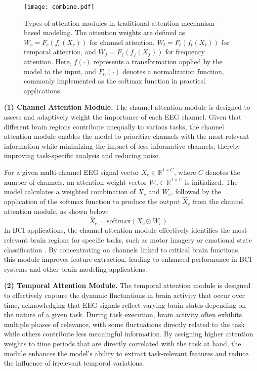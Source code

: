 \documentclass[preprint,12pt]{elsarticle}
\begin{document}
\begin{figure*}[h]
\centering
\texttt{[image: combine.pdf]}
\caption{Types of attention modules in traditional attention mechanism-based modeling. The attention weights are defined as $W_c = F_c(f_c(X_c))$ for channel attention, $W_t = F_t(f_t(X_t))$ for temporal attention, and $W_f = F_f(f_f(X_f))$ for frequency attention. Here, $f(\cdot)$ represents a transformation applied by the model to the input, and $F_n(\cdot)$ denotes a normalization function, commonly implemented as the softmax function in practical applications.}
\label{fig:TypeAtt}
\end{figure*}

\textbf{(1) Channel Attention Module.} The channel attention module is designed to assess and adaptively weight the importance of each EEG channel. Given that different brain regions contribute unequally to various tasks, the channel attention module enables the model to prioritize channels with the most relevant information while minimizing the impact of less informative channels, thereby improving task-specific analysis and reducing noise.

For a given multi-channel EEG signal vector $X_c \in \mathbb{R}^{1 \times C}$, where $C$ denotes the number of channels, an attention weight vector $W_c \in \mathbb{R}^{1 \times C}$ is initialized. The model calculates a weighted combination of $X_c$ and $W_c$, followed by the application of the softmax function to produce the output $\hat{X}_c$ from the channel attention module, as shown below:
\begin{equation}
\hat{X}_c= \text{softmax}(X_c \odot W_c) 
\end{equation}
In BCI applications, the channel attention module effectively identifies the most relevant brain regions for specific tasks, such as motor imagery or emotional state classification \cite{wu2023classification, chen2021multiattention, tao2020eeg, liu20213dcann}. By concentrating on channels linked to critical brain functions, this module improves feature extraction, leading to enhanced performance in BCI systems and other brain modeling applications.

\textbf{(2) Temporal Attention Module.} The temporal attention module is designed to effectively capture the dynamic fluctuations in brain activity that occur over time, acknowledging that EEG signals reflect varying brain states depending on the nature of a given task. During task execution, brain activity often exhibits multiple phases of relevance, with some fluctuations directly related to the task while others contribute less meaningful information. By assigning higher attention weights to time periods that are directly correlated with the task at hand, the module enhances the model's ability to extract task-relevant features and reduce the influence of irrelevant temporal variations.
\end{document}

